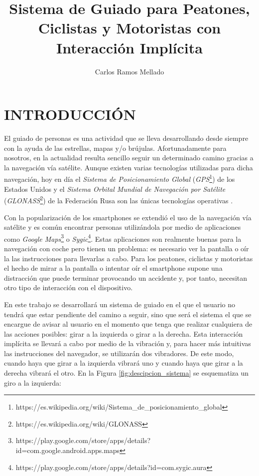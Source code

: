 \documentclass{pre-tfg}
\title{Sistema de Guiado para Peatones, Ciclistas y Motoristas con Interacción Implícita}
\author{Carlos Ramos Mellado}
\begin{document}
\maketitle
\tableofcontents

\newpage

\section{INTRODUCCIÓN}

El guiado de personas es una actividad que se lleva desarrollando desde siempre con la ayuda de las estrellas, mapas y/o brújulas. Afortunadamente para nosotros, en la actualidad resulta sencillo seguir un determinado camino gracias a la navegación vía satélite. Aunque existen varias tecnologías utilizadas para dicha navegación, hoy en día el \textit{Sistema de Posicionamiento Global} (\textit{GPS}\footnote{https://es.wikipedia.org/wiki/Sistema\_de\_posicionamiento\_global}) de los Estados Unidos y el \textit{Sistema Orbital Mundial de Navegación por Satélite} (\textit{GLONASS}\footnote{https://es.wikipedia.org/wiki/GLONASS}) de la Federación Rusa son las únicas tecnologías operativas \cite{SPSA}.

Con la popularización de los smartphones se extendió el uso de la navegación vía satélite y es común encontrar personas utilizándola por medio de aplicaciones como \textit{Google Maps}\footnote{https://play.google.com/store/apps/details?id=com.google.android.apps.maps} o \textit{Sygic}\footnote{https://play.google.com/store/apps/details?id=com.sygic.aura}. Estas aplicaciones son realmente buenas para la navegación con coche pero tienen un problema: es necesario ver la pantalla o oír la las instrucciones para llevarlas a cabo. Para los peatones, ciclistas y motoristas el hecho de mirar a la pantalla o intentar oír el smartphone supone una distracción que puede terminar provocando un accidente \cite{Valcarcel12}  y, por tanto, necesitan otro tipo de interacción con el dispositivo.

En este trabajo se desarrollará un sistema de guiado en el que el usuario no tendrá que estar pendiente del camino a seguir, sino que será el sistema el que se encargue de avisar al usuario en el momento que tenga que realizar cualquiera de las acciones posibles: girar a la izquierda o girar a la derecha. Esta interacción implícita se llevará a cabo por medio de la vibración y, para hacer más intuitivas las instrucciones del navegador, se utilizarán dos vibradores. De este modo, cuando haya que girar a la izquierda vibrará uno y cuando haya que girar a la derecha vibrará el otro. En la Figura \ref{fig:descipcion_sistema} se esquematiza un giro a la izquierda:
\end{document}
